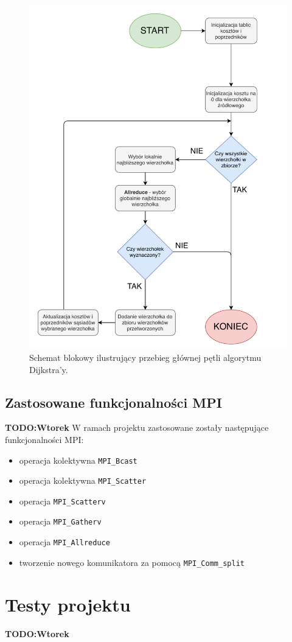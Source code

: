 \documentclass[12pt]{article}
\begin{document}
\begin{figure}[H]
\centering
\includegraphics[width=\textwidth]{static/Diagram3.pdf}
\caption{Schemat blokowy ilustrujący przebieg głównej pętli algorytmu Dijkstra'y.}
\label{fig:diagram3}
\end{figure}


\subsection{Zastosowane funkcjonalności MPI}
\textbf{TODO:Wtorek}
W ramach projektu zastosowane zostały następujące funkcjonalności MPI:
\begin{itemize}
\item operacja kolektywna \lstinline{MPI_Bcast}
\item operacja kolektywna \lstinline{MPI_Scatter}
\item operacja \lstinline{MPI_Scatterv}
\item operacja \lstinline{MPI_Gatherv}
\item operacja \lstinline{MPI_Allreduce}
\item tworzenie nowego komunikatora za pomocą \lstinline{MPI_Comm_split}
\end{itemize}

\section{Testy projektu}
\textbf{TODO:Wtorek}
\end{document}
